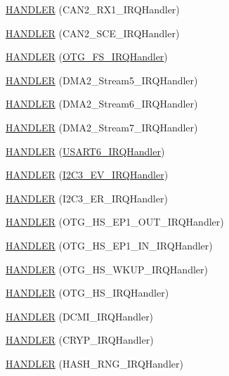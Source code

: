 \begin{DoxyCompactItemize}
\hyperlink{group___p_i_o_s_ga92aa6d0570148148f28d084240182be1}{\-H\-A\-N\-D\-L\-E\-R} (\-C\-A\-N2\-\_\-\-R\-X1\-\_\-\-I\-R\-Q\-Handler)
\item 
\hyperlink{group___p_i_o_s_gad32a556af377661534f4ec502a087681}{\-H\-A\-N\-D\-L\-E\-R} (\-C\-A\-N2\-\_\-\-S\-C\-E\-\_\-\-I\-R\-Q\-Handler)
\item 
\hyperlink{group___p_i_o_s_gafcfcd1e017eeb75287de863ab8a1478a}{\-H\-A\-N\-D\-L\-E\-R} (\hyperlink{group___p_i_o_s___u_s_b_h_o_o_k_ga75135d7a041e2932e9903e8a345b3fc4}{\-O\-T\-G\-\_\-\-F\-S\-\_\-\-I\-R\-Q\-Handler})
\item 
\hyperlink{group___p_i_o_s_ga1f64cc7d597320a5204bb47080011574}{\-H\-A\-N\-D\-L\-E\-R} (\-D\-M\-A2\-\_\-\-Stream5\-\_\-\-I\-R\-Q\-Handler)
\item 
\hyperlink{group___p_i_o_s_ga108b995e36b02ef3e15f87fc683f1786}{\-H\-A\-N\-D\-L\-E\-R} (\-D\-M\-A2\-\_\-\-Stream6\-\_\-\-I\-R\-Q\-Handler)
\item 
\hyperlink{group___p_i_o_s_ga49402f17f34d2b768b0ed14c97136ce8}{\-H\-A\-N\-D\-L\-E\-R} (\-D\-M\-A2\-\_\-\-Stream7\-\_\-\-I\-R\-Q\-Handler)
\item 
\hyperlink{group___p_i_o_s_ga962e492fca169f575b163bb0bacdc03d}{\-H\-A\-N\-D\-L\-E\-R} (\hyperlink{group___p_i_o_s___u_s_a_r_t_ga12c827857d907ad0cccd586fd934d446}{\-U\-S\-A\-R\-T6\-\_\-\-I\-R\-Q\-Handler})
\item 
\hyperlink{group___p_i_o_s_ga9a88bd32032026c57ae5f7685f0e86ae}{\-H\-A\-N\-D\-L\-E\-R} (\hyperlink{group___revolution_ga749eb918c398cc3f11f47ec317757573}{\-I2\-C3\-\_\-\-E\-V\-\_\-\-I\-R\-Q\-Handler})
\item 
\hyperlink{group___p_i_o_s_ga8cd90e3b30cdf4d3e7a4fc9022768fcf}{\-H\-A\-N\-D\-L\-E\-R} (\-I2\-C3\-\_\-\-E\-R\-\_\-\-I\-R\-Q\-Handler)
\item 
\hyperlink{group___p_i_o_s_ga55d1c6dae88d8aa9ae24b07010113ca9}{\-H\-A\-N\-D\-L\-E\-R} (\-O\-T\-G\-\_\-\-H\-S\-\_\-\-E\-P1\-\_\-\-O\-U\-T\-\_\-\-I\-R\-Q\-Handler)
\item 
\hyperlink{group___p_i_o_s_gaf10d7571fc1c39118b6a0a779f18f7a3}{\-H\-A\-N\-D\-L\-E\-R} (\-O\-T\-G\-\_\-\-H\-S\-\_\-\-E\-P1\-\_\-\-I\-N\-\_\-\-I\-R\-Q\-Handler)
\item 
\hyperlink{group___p_i_o_s_ga3b875f3bd65fd974cf4e8b29b2d71b97}{\-H\-A\-N\-D\-L\-E\-R} (\-O\-T\-G\-\_\-\-H\-S\-\_\-\-W\-K\-U\-P\-\_\-\-I\-R\-Q\-Handler)
\item 
\hyperlink{group___p_i_o_s_ga5311b7f23d19c0fb8b696d2759202e76}{\-H\-A\-N\-D\-L\-E\-R} (\-O\-T\-G\-\_\-\-H\-S\-\_\-\-I\-R\-Q\-Handler)
\item 
\hyperlink{group___p_i_o_s_ga3aa6cb3ec72ada671e5942718f69efa5}{\-H\-A\-N\-D\-L\-E\-R} (\-D\-C\-M\-I\-\_\-\-I\-R\-Q\-Handler)
\item 
\hyperlink{group___p_i_o_s_ga2b36ce025c75d394fbdc509201d8b237}{\-H\-A\-N\-D\-L\-E\-R} (\-C\-R\-Y\-P\-\_\-\-I\-R\-Q\-Handler)
\item 
\hyperlink{group___p_i_o_s_ga256101589d80098fdf7e10440c2fca7d}{\-H\-A\-N\-D\-L\-E\-R} (\-H\-A\-S\-H\-\_\-\-R\-N\-G\-\_\-\-I\-R\-Q\-Handler)
\end{DoxyCompactItemize}


